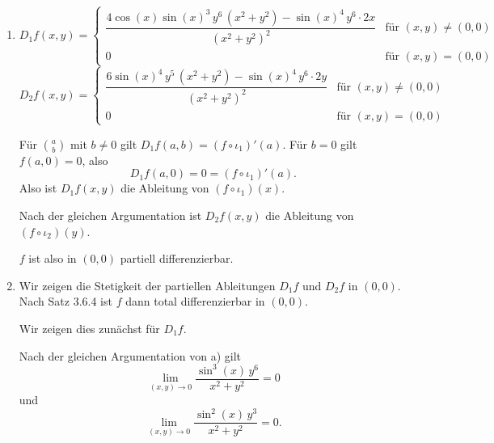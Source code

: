 \documentclass[a4paper,12pt]{article}
\begin{document}
\begin{enumerate}[label=\alph*)]
    \textit{Fall 2: $y^2 < x^2$}

    Wir können direkt schließen:
    \begin{align*}
        |f(x,y)| &= \left| \frac{\sin(x)^4 \, y^6}{x^2 + y^2} \right| \\
        &\leq \left| \frac{\sin(x)^4 \, y^6}{2 y^2} \right| && (\text{wegen } y^2 < x^2) \\
        &= \left| \frac{\sin(x)^4 \, y^4}{2} \right| \\
        &\leq \left| \frac{y^4}{2} \right| && (\text{wegen } |\sin(x)| \leq 1) \\
        &< \frac{|y|}{2} && (\text{wegen } |y| < \delta \leq 1) \\
        &< \varepsilon && (\text{wegen } |y| < \delta \leq 2\varepsilon)
    \end{align*}

    \item
    \[
        D_1 f(x,y) = \begin{cases}
            \dfrac{4 \cos(x) \sin(x)^3 \, y^6 \, (x^2 + y^2) - \sin(x)^4 \, y^6 \cdot 2x}{(x^2 + y^2)^2} & \text{für } (x,y) \neq (0,0) \\[1em]
            0 & \text{für } (x,y) = (0,0)
        \end{cases}
    \]
    \[
        D_2 f(x,y) = \begin{cases}
            \dfrac{6 \sin(x)^4 \, y^5 \, (x^2 + y^2) - \sin(x)^4 \, y^6 \cdot 2y}{(x^2 + y^2)^2} & \text{für } (x,y) \neq (0,0) \\[1em]
            0 & \text{für } (x,y) = (0,0)
        \end{cases}
    \]

    Für $\binom{a}{b}$ mit $b \neq 0$ gilt $D_1 f(a,b) = (f \circ \iota_1)'(a)$. Für $b = 0$ gilt $f(a, 0) = 0$, also
    \[
        D_1 f(a, 0) = 0 = (f \circ \iota_1)'(a).
    \]
    Also ist $D_1 f(x,y)$ die Ableitung von $(f \circ \iota_1)(x)$.

    Nach der gleichen Argumentation ist $D_2 f(x,y)$ die Ableitung von $(f \circ \iota_2)(y)$.

    $f$ ist also in $(0,0)$ partiell differenzierbar.

    \item
    Wir zeigen die Stetigkeit der partiellen Ableitungen $D_1 f$ und $D_2 f$ in $(0,0)$. Nach Satz 3.6.4 ist $f$ dann total differenzierbar in $(0,0)$.

    Wir zeigen dies zunächst für $D_1 f$.

    Nach der gleichen Argumentation von a) gilt
    \[
        \lim_{(x,y) \to 0} \frac{\sin^3(x) \, y^6}{x^2 + y^2} = 0
    \]
    und
    \[
        \lim_{(x,y) \to 0} \frac{\sin^2(x) \, y^3}{x^2 + y^2} = 0.
    \]


\end{enumerate}
\end{document}
